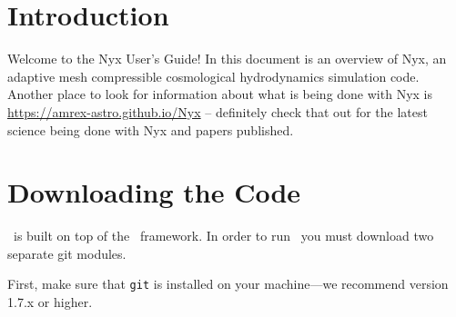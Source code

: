 
\section{Introduction}

Welcome to the Nyx User's Guide!  In this document is an overview of Nyx, an adaptive mesh
compressible cosmological hydrodynamics simulation code.
Another place to look for information about what is being done with Nyx is
{\url{https://amrex-astro.github.io/Nyx}} -- definitely check that out for
the latest science being done with Nyx and papers published.

\section{Downloading the Code}

\nyx\ is built on top of the \amrex\ framework.  In order to run
\nyx\, you must download two separate git modules.

\vspace{.1in}

\noindent First, make sure that {\tt git} is installed on your machine---we recommend version 1.7.x or higher.

\vspace{.1in}

